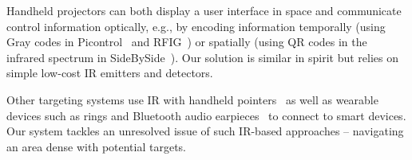 Handheld projectors can both display a user interface in space and communicate control information optically, e.g., by encoding information temporally (using Gray codes in Picontrol~\cite{schmidt_picontrol:_2012} and RFIG~\cite{raskar_rfig_2004}) or spatially (using QR codes in the infrared spectrum in SideBySide~\cite{willis_sidebyside:_2011}). Our solution is similar in spirit but relies on simple low-cost IR emitters and detectors. 

Other targeting systems use IR with handheld pointers~\cite{swindells_that_2002} as well as wearable devices such as rings and Bluetooth audio earpieces~\cite{merrill_augmenting_2007} to connect to smart devices. Our system tackles an unresolved issue of such IR-based approaches -- navigating an area dense with potential targets.
